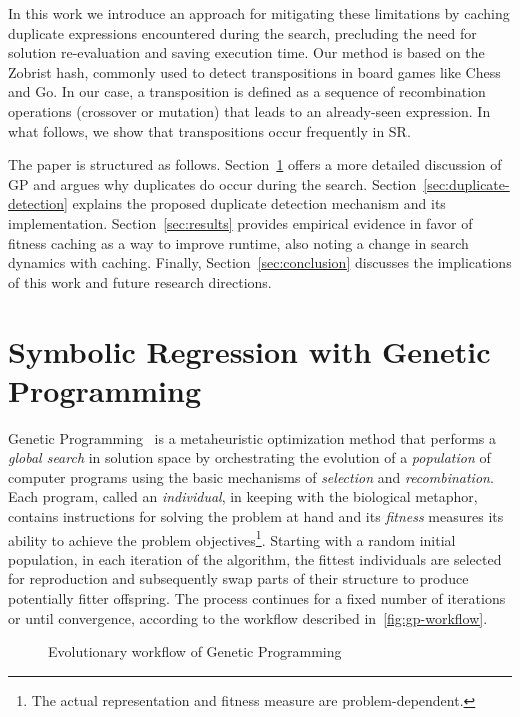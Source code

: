 \documentclass[openacc]{rstransa}%
\begin{document}
In this work we introduce an approach for mitigating these limitations by caching duplicate expressions encountered during the search, precluding the need for solution re-evaluation and saving execution time. Our method is based on the Zobrist hash, commonly used to detect transpositions in board games like Chess and Go. In our case, a transposition is defined as a sequence of recombination operations (crossover or mutation) that leads to an already-seen expression. In what follows, we show that transpositions occur frequently in SR.

The paper is structured as follows. Section~\ref{sec:genetic-programming} offers a more detailed discussion of GP and argues why duplicates do occur during the search. Section~\ref{sec:duplicate-detection} explains the proposed duplicate detection mechanism and its implementation. Section~\ref{sec:results} provides empirical evidence in favor of fitness caching as a way to improve runtime, also noting a change in search dynamics with caching. Finally, Section~\ref{sec:conclusion} discusses the implications of this work and future research directions.

\section{Symbolic Regression with Genetic Programming}\label{sec:genetic-programming}

Genetic Programming~\cite{koza1992} is a metaheuristic optimization method that performs a \emph{global search} in solution space by orchestrating the evolution of a \textit{population} of computer programs using the basic mechanisms of \textit{selection} and \textit{recombination}.
%
Each program, called an \textit{individual}, in keeping with the biological metaphor, contains instructions for solving the problem at hand and its \textit{fitness} measures its ability to achieve the problem objectives\footnote{The actual representation and fitness measure are problem-dependent.}. Starting with a random initial population, in each iteration of the algorithm, the fittest individuals are selected for reproduction and subsequently swap parts of their structure to produce potentially fitter offspring. The process continues for a fixed number of iterations or until convergence, according to the workflow described in~\autoref{fig:gp-workflow}.

\begin{figure}
    \vspace{-2em}
    \caption{Evolutionary workflow of Genetic Programming}
    \label{fig:gp-workflow}
\end{figure}
\end{document}
